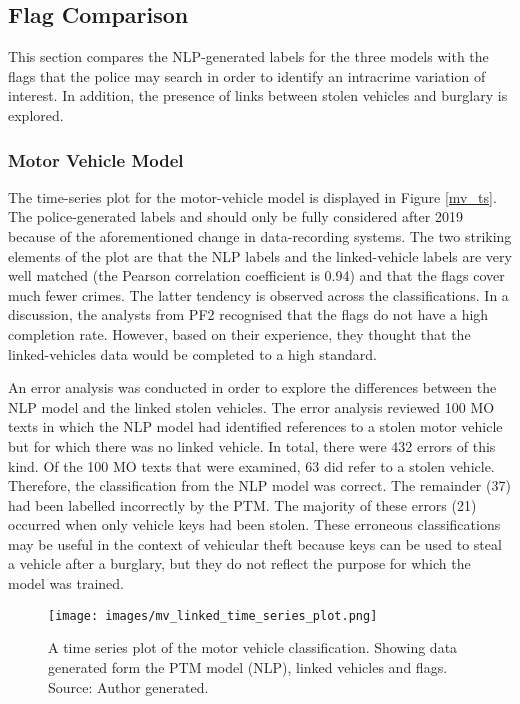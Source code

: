 

\subsection{Flag Comparison} This section compares the NLP-generated labels for the three models with the flags that the police may search in order to identify an intracrime variation of interest. In addition, the presence of links between stolen vehicles and burglary is explored.

\subsubsection{Motor Vehicle Model} The time-series plot for the motor-vehicle model is displayed in Figure \ref{mv_ts}. The police-generated labels  and  should only be fully considered after 2019 because of the aforementioned change in data-recording systems. The two striking elements of the plot are that the NLP labels and the linked-vehicle labels are very well matched (the Pearson correlation coefficient is 0.94) and that the flags cover much fewer crimes. The latter tendency is observed across the classifications. In a discussion, the analysts from PF2 recognised that the flags do not have a high completion rate. However, based on their experience, they thought that the linked-vehicles data would be completed to a high standard.

An error analysis was conducted in order to explore the differences between the NLP model and the linked stolen vehicles. The error analysis reviewed 100 MO texts in which the NLP model had identified references to a stolen motor vehicle but for which there was no linked vehicle. In total, there were 432 errors of this kind. Of the 100 MO texts that were examined, 63 did refer to a stolen vehicle. Therefore, the classification from the NLP model was correct. The remainder (37) had been labelled incorrectly by the PTM. The majority of these errors (21) occurred when only vehicle keys had been stolen. These erroneous classifications may be useful in the context of vehicular theft because keys can be used to steal a vehicle after a burglary, but they do not reflect the purpose for which the model was trained. 


\begin{figure}
  \texttt{[image: images/mv\_linked\_time\_series\_plot.png]}
  \caption[Motor vehicle model time series plot]{A time series plot of the motor vehicle classification. Showing data generated form the PTM model (NLP), linked vehicles and flags. Source: Author generated.}
  \label{fig:mv_ts}
\end{figure}

